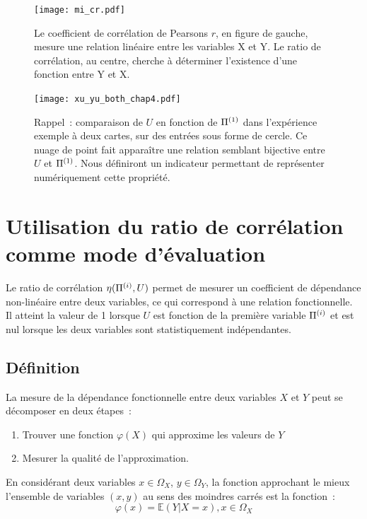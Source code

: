 \documentclass[../main]{subfiles}
\begin{document}
\begin{figure}
    \texttt{[image: mi\_cr.pdf]}
    \caption{Le coefficient de corrélation de Pearsons $r$, en figure de gauche, mesure une relation linéaire entre les variables X et Y. Le ratio de corrélation, au centre, cherche à déterminer l'existence d'une fonction entre Y et X. \label{fig:signaux}}
\end{figure}

\begin{figure}
    \centering
    \texttt{[image: xu\_yu\_both\_chap4.pdf]}
    \caption{Rappel~: comparaison de $U$ en fonction de $\Pi^{({1})}$ dans l'expérience exemple à deux cartes, sur des entrées sous forme de cercle. Ce nuage de point fait apparaître une relation semblant bijective entre $U$ et $\Pi^{({1})}$. Nous définiront un indicateur permettant de représenter numériquement cette propriété.
    \label{fig:upi_chap4}}
\end{figure}

\section{Utilisation du ratio de corrélation comme mode d'évaluation}

Le ratio de corrélation $\eta(\Pi^{({i})},U)$ permet de mesurer un coefficient de dépendance non-linéaire entre deux variables, ce qui correspond à une relation fonctionnelle. Il atteint la valeur de 1 lorsque $U$ est fonction de la première variable $\Pi^{({i})}$ et est nul lorsque les deux variables sont statistiquement indépendantes.

\subsection{Définition}

La mesure de la dépendance fonctionnelle entre deux variables $X$ et $Y$ peut se décomposer en deux étapes~:
\begin{enumerate}
    \item Trouver une fonction $\varphi(X)$ qui approxime les valeurs de $Y$
    \item Mesurer la qualité de l'approximation.
\end{enumerate}

En considérant deux variables $x \in \Omega_X$, $y \in \Omega_Y$, la fonction approchant le mieux l'ensemble de variables $(x,y)$ au sens des moindres carrés est la fonction~:
\begin{equation}
    \varphi(x) = \mathbb{E}(Y|X = x), x \in \Omega_X
\end{equation}
\end{document}

